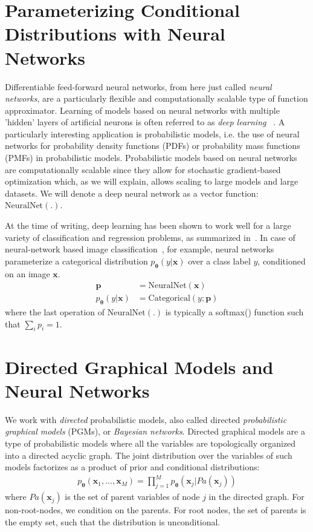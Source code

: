 \documentclass[MAL,biber]{nowfnt} %
\newcommand{\bb}[1]{\mathbf{#1}}
\newcommand{\bx}{\bb{x}}
\newcommand{\bp}{\bb{p}}
\newcommand{\bT}{\boldsymbol{\theta}}
\newcommand{\pT}{p_{\bT}}
\begin{document}
\section{Parameterizing Conditional Distributions with Neural Networks}
Differentiable feed-forward neural networks, from here just called \emph{neural networks}, are a particularly flexible and computationally scalable type of function approximator. Learning of models based on neural networks with multiple 'hidden' layers of artificial neurons is often referred to as \emph{deep learning} ~\citep{goodfellow2016deeplearning,lecun2015deep}. A particularly interesting application is probabilistic models, i.e. the use of neural networks for probability density functions (PDFs) or probability mass functions (PMFs) in probabilistic models. Probabilistic models based on neural networks are computationally scalable since they allow for stochastic gradient-based optimization which, as we will explain, allows scaling to large models and large datasets. We will denote a deep neural network as a vector function: $\text{NeuralNet}(.)$.

At the time of writing, deep learning has been shown to work well for a large variety of classification and regression problems, as summarized in~\citep{lecun2015deep,goodfellow2016deeplearning}. 
In case of neural-network based image classification~\cite{lecun1998gradient}, for example, neural networks parameterize a categorical distribution $\pT(y|\bx)$ over a class label $y$, conditioned on an image $\bx$.
\begin{align}
\bp &= \text{NeuralNet}(\bx)\\
\pT(y|\bx) &= \text{Categorical}(y; \bp)
\end{align}
where the last operation of $\text{NeuralNet}(.)$ is typically a softmax() function such that $\sum_i p_i = 1$. 

\section{Directed Graphical Models and Neural Networks}
\label{sec:directedgraphicalmodel}
We work with \emph{directed} probabilistic models, also called directed \emph{probabilistic graphical models} (PGMs), or \emph{Bayesian networks}. Directed graphical models are a type of probabilistic models where all the variables are topologically organized into a directed acyclic graph. The joint distribution over the variables of such models factorizes as a product of prior and conditional distributions: 
\begin{align}
\pT(\bx_1,...,\bx_M) = \prod_{j=1}^M \pT(\bx_j | Pa(\bx_j)) 
\label{eq:dgm}
\end{align}
where $Pa(\bx_j)$ is the set of parent variables of node $j$ in the directed graph. For non-root-nodes, we condition on the parents. For root nodes, the set of parents is the empty set, such that the distribution is unconditional.
\end{document}
